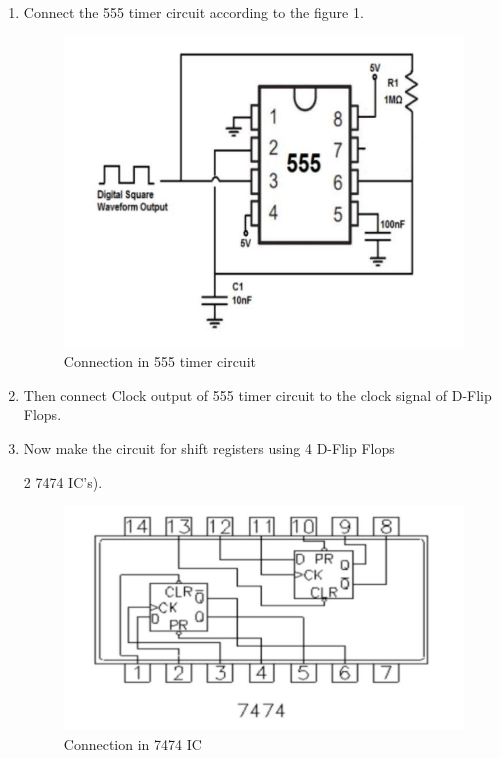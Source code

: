 \documentclass[journal,12pt,twocolumn]{IEEEtran}
\theoremstyle{remark}
\begin{document}
			\begin{enumerate}
				\item Connect the 555 timer circuit according to the figure 1.
					\begin{figure}[h]
						\includegraphics[width=\linewidth]{images/555_timer_circuit.jpg}
						\caption{Connection in 555 timer circuit}
						\label{555_t_c}
					\end{figure}
				\item Then connect Clock output of 555 timer circuit to the clock signal of D-Flip Flops.
					\\
				\item Now make the circuit for shift registers using 4 D-Flip Flops {2 7474 IC's).
					\begin{figure}[h]
						\includegraphics[width=\linewidth]{images/7474.jpg}
						\caption{Connection in 7474 IC}
						\label{7474_IC}
					\end{figure}

}
\end{enumerate}
\end{document}
